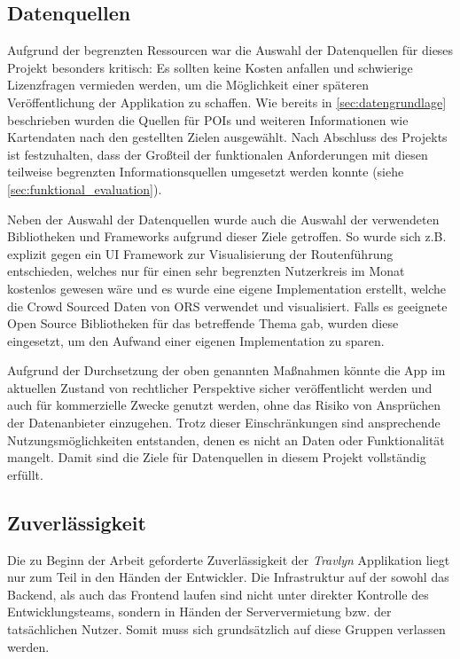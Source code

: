 	\subsection{Datenquellen}
	Aufgrund der begrenzten Ressourcen war die Auswahl der Datenquellen für dieses Projekt besonders kritisch: Es sollten keine Kosten anfallen und schwierige Lizenzfragen vermieden werden, um die Möglichkeit einer späteren Veröffentlichung der Applikation zu schaffen. Wie bereits in \autoref{sec:datengrundlage} beschrieben wurden die Quellen für \acs{POI}s und weiteren Informationen wie Kartendaten nach den gestellten Zielen ausgewählt. Nach Abschluss des Projekts ist festzuhalten, dass der Großteil der funktionalen Anforderungen mit diesen teilweise begrenzten Informationsquellen umgesetzt werden konnte (siehe \autoref{sec:funktional_evaluation}).
	
	\vspace{0.25cm}
	
	Neben der Auswahl der Datenquellen wurde auch die Auswahl der verwendeten Bibliotheken und Frameworks aufgrund dieser Ziele getroffen. So wurde sich z.B. explizit gegen ein UI Framework zur Visualisierung der Routenführung entschieden, welches nur für einen sehr begrenzten Nutzerkreis im Monat kostenlos gewesen wäre und es wurde eine eigene Implementation erstellt, welche die Crowd Sourced Daten von \acs{ORS} verwendet und visualisiert. Falls es geeignete Open Source Bibliotheken für das betreffende Thema gab, wurden diese eingesetzt, um den Aufwand einer eigenen Implementation zu sparen.
	
	\vspace{0.25cm}
	
	Aufgrund der Durchsetzung der oben genannten Maßnahmen könnte die App im aktuellen Zustand von rechtlicher Perspektive sicher veröffentlicht werden und auch für kommerzielle Zwecke genutzt werden, ohne das Risiko von Ansprüchen der Datenanbieter einzugehen. Trotz dieser Einschränkungen sind ansprechende Nutzungsmöglichkeiten entstanden, denen es nicht an Daten oder Funktionalität mangelt. Damit sind die Ziele für Datenquellen in diesem Projekt vollständig erfüllt.
	
	\subsection{Zuverlässigkeit}
	
	Die zu Beginn der Arbeit geforderte Zuverlässigkeit der \textit{Travlyn} Applikation liegt nur zum Teil in den Händen der Entwickler. Die Infrastruktur auf der sowohl das Backend, als auch das Frontend laufen sind nicht unter direkter Kontrolle des Entwicklungsteams, sondern in Händen der Serververmietung bzw. der tatsächlichen Nutzer. Somit muss sich grundsätzlich auf diese Gruppen verlassen werden.
	
